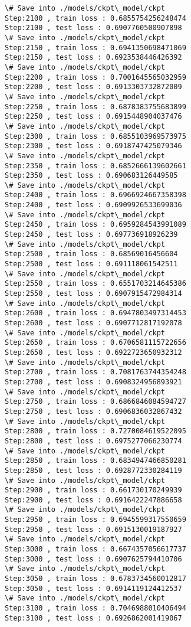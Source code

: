 \documentclass[11pt]{article}
\begin{document}
\begin{Verbatim}[commandchars=\\\{\}]
\# Save into ./models/ckpt\_model/ckpt
Step:2100 , train loss : 0.6855754256248474
Step:2100 , test loss : 0.6907760500907898
\# Save into ./models/ckpt\_model/ckpt
Step:2150 , train loss : 0.6941350698471069
Step:2150 , test loss : 0.6923538446426392
\# Save into ./models/ckpt\_model/ckpt
Step:2200 , train loss : 0.7001645565032959
Step:2200 , test loss : 0.6913303732872009
\# Save into ./models/ckpt\_model/ckpt
Step:2250 , train loss : 0.6878383755683899
Step:2250 , test loss : 0.6915448904037476
\# Save into ./models/ckpt\_model/ckpt
Step:2300 , train loss : 0.6855103969573975
Step:2300 , test loss : 0.6918747425079346
\# Save into ./models/ckpt\_model/ckpt
Step:2350 , train loss : 0.6852666139602661
Step:2350 , test loss : 0.690683126449585
\# Save into ./models/ckpt\_model/ckpt
Step:2400 , train loss : 0.6966924667358398
Step:2400 , test loss : 0.6909926533699036
\# Save into ./models/ckpt\_model/ckpt
Step:2450 , train loss : 0.6959284543991089
Step:2450 , test loss : 0.697736918926239
\# Save into ./models/ckpt\_model/ckpt
Step:2500 , train loss : 0.68569016456604
Step:2500 , test loss : 0.691118061542511
\# Save into ./models/ckpt\_model/ckpt
Step:2550 , train loss : 0.6551703214645386
Step:2550 , test loss : 0.6907915472984314
\# Save into ./models/ckpt\_model/ckpt
Step:2600 , train loss : 0.6947803497314453
Step:2600 , test loss : 0.6907712817192078
\# Save into ./models/ckpt\_model/ckpt
Step:2650 , train loss : 0.6706581115722656
Step:2650 , test loss : 0.6922723650932312
\# Save into ./models/ckpt\_model/ckpt
Step:2700 , train loss : 0.7081763744354248
Step:2700 , test loss : 0.6908324956893921
\# Save into ./models/ckpt\_model/ckpt
Step:2750 , train loss : 0.6866846084594727
Step:2750 , test loss : 0.6906836032867432
\# Save into ./models/ckpt\_model/ckpt
Step:2800 , train loss : 0.7270084619522095
Step:2800 , test loss : 0.6975277066230774
\# Save into ./models/ckpt\_model/ckpt
Step:2850 , train loss : 0.6834947466850281
Step:2850 , test loss : 0.6928772330284119
\# Save into ./models/ckpt\_model/ckpt
Step:2900 , train loss : 0.661730170249939
Step:2900 , test loss : 0.6916422247886658
\# Save into ./models/ckpt\_model/ckpt
Step:2950 , train loss : 0.6945599317550659
Step:2950 , test loss : 0.6915130019187927
\# Save into ./models/ckpt\_model/ckpt
Step:3000 , train loss : 0.6674357056617737
Step:3000 , test loss : 0.6907625794410706
\# Save into ./models/ckpt\_model/ckpt
Step:3050 , train loss : 0.6783734560012817
Step:3050 , test loss : 0.6914119124412537
\# Save into ./models/ckpt\_model/ckpt
Step:3100 , train loss : 0.7046988010406494
Step:3100 , test loss : 0.6926862001419067

\end{Verbatim}
\end{document}
